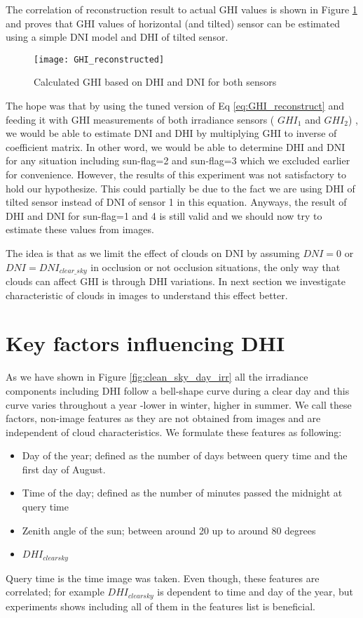 The correlation of reconstruction result to actual GHI values is shown in Figure \ref{fig:GHI_reconstruct_result} and proves that GHI values of horizontal (and tilted) sensor can be estimated using a simple DNI model and DHI of tilted sensor.


\begin{figure}[h]
\caption{Calculated GHI based on DHI and DNI for both sensors}
\label{fig:GHI_reconstruct_result}
\texttt{[image: GHI\_reconstructed]}
\centering
\end{figure}

The hope was that by using the tuned version of Eq \ref{eq:GHI_reconstruct} and feeding it with GHI measurements of both irradiance sensors ( $GHI_1$ and  $GHI_2$) , we would be able to estimate DNI and DHI by multiplying GHI to inverse of coefficient matrix. In other word, we would be able to determine DHI and DNI for any situation including sun-flag=2 and sun-flag=3 which we excluded earlier for convenience. However, the results of this experiment was not satisfactory to hold our hypothesize. This could partially be due to the fact we are using DHI of tilted sensor instead of DNI of sensor 1 in this equation. Anyways,   the result of DHI and DNI for sun-flag=1 and 4 is still valid and we should now try to estimate these values from images.

The idea is that as we limit the effect of clouds on DNI by assuming $DNI=0$ or $DNI=DNI_{clear\_sky}$ in occlusion or not occlusion situations, the only way that clouds can affect GHI is through DHI variations. In next section we investigate characteristic of clouds in images to understand this effect better.

\section{Key factors influencing DHI}
\label{sec:img-features}
As we have shown in Figure \ref{fig:clean_sky_day_irr} all the irradiance components including DHI follow a bell-shape curve during a clear day and this curve varies throughout a year -lower in winter, higher in summer. We call these factors, non-image features as they are not obtained from images and are independent of cloud characteristics. We formulate these features as following:
\begin{itemize}
\item Day of the year; defined as the number of days between query time and the first day of August.
\item Time of the day; defined as the number of minutes passed the midnight at query time
\item Zenith angle of the sun; between around 20 up to around 80 degrees
\item $DHI_{clear sky}$
\end{itemize}
Query time is the time image was taken. Even though, these features are correlated; for example $DHI_{clear sky}$ is dependent to time and day of the year, but experiments shows including all of them in the features list is beneficial.
\newline

